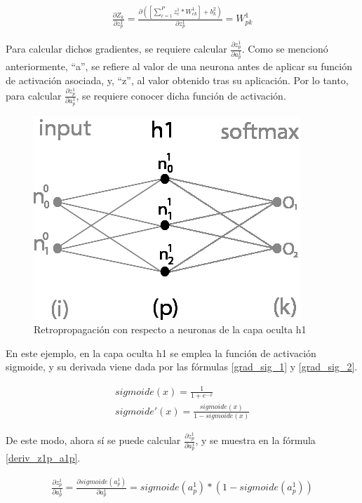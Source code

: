 \begin{gather}
	\frac{\partial Z_k}{\partial z^1_p} = \frac{\partial( [\sum_{c=1}^{P} z^1_c * W^1_{ck}] + b^2_k)}{\partial z^1_p} = W^1_{pk}
	\label{deriv_Zk_z1p}
\end{gather}

Para calcular dichos gradientes, se requiere calcular $\frac{\partial z^1_p}{\partial a^1_p}$. Como se mencionó anteriormente, ``a'', se refiere al valor de una neurona antes de aplicar su función de activación asociada, y, ``z'', al valor obtenido tras su aplicación. Por lo tanto, para calcular $\frac{\partial z^1_p}{\partial a^1_p}$, se requiere conocer dicha función de activación.

\begin{figure}[H]
	\centering
	\includegraphics[scale=0.35]{imagenes/nn_1_capa_h1.jpg}  
	\caption{Retropropagación con respecto a neuronas de la capa oculta h1}
	\label{fig:nn_1_capa_h1}
\end{figure}

En este ejemplo, en la capa oculta h1 se emplea la función de activación sigmoide, y su derivada viene dada por las fórmulas \ref{grad_sig_1} y \ref{grad_sig_2}. 

\begin{gather}
	sigmoide(x) = \frac{1}{1+e^{-x}} \label{grad_sig_1} \\
	sigmoide'(x) = \frac{sigmoide(x)}{1-sigmoide(x)} \label{grad_sig_2}
\end{gather}

De este modo, ahora sí se puede calcular $\frac{\partial z^1_p}{\partial a^1_p}$, y se muestra en la fórmula \ref{deriv_z1p_a1p}.

\begin{gather}
	\frac{\partial z^1_ p}{\partial a^1_p} = \frac{\partial sigmoide(a^1_p)}{\partial a^1_p} = sigmoide(a^1_p)*(1-sigmoide(a^1_p))
	\label{deriv_z1p_a1p}
\end{gather}

